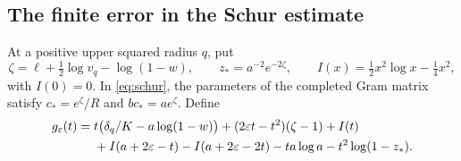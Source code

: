 \subsection{The finite error in the Schur estimate}
At a positive upper squared radius $q$, put
\[
 \zeta=\ell+\tfrac12\log v_q-\log(1-w),\qquad
 z_*=a^{-2}e^{-2\zeta},\qquad
 I(x)=\tfrac12x^2\log x-\tfrac14x^2,
\]
with $I(0)=0$. In \eqref{eq:schur}, the parameters of the completed
Gram matrix satisfy $c_*=e^\zeta/R$ and $bc_*=ae^\zeta$.
Define
\begin{align}
 g_\varepsilon(t)={}&t\bigl(\delta_q/K-a\log(1-w)\bigr)
          +(2\varepsilon t-t^2)(\zeta-1)+I(t)\notag\\
 &+I(a+2\varepsilon-t)-I(a+2\varepsilon-2t)
               -ta\log a-t^2\log(1-z_*).
 \label{eq:schur-finite}
\end{align}

